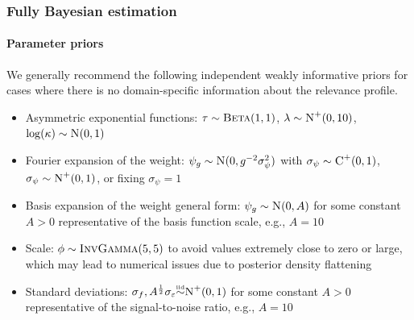 \documentclass{snedecorbeamer}
\begin{document}
\begin{frame}%
  \label{frm:bayesian-priors}
  \frametitle{Fully Bayesian estimation}
  \framesubtitle{Parameter priors}

  We generally recommend the following independent weakly informative priors for
  cases where there is no domain-specific information about the relevance profile.
  \begin{itemize}
  \item Asymmetric exponential functions:
    $\tau \sim \textsc{Beta}(1, 1)$,
    $\lambda \sim \textsc{N}^{+}(0, 10)$,
    $\log(\kappa) \sim \textsc{N}(0, 1)$
  \item Fourier expansion of the weight:
    $\psi_g\sim\textsc{N}(0, g^{-2}\sigma^2_\psi)$ with
    $\sigma_\psi\sim\textsc{C}^+(0, 1)$, $\sigma_\psi\sim\textsc{N}^+(0, 1)$,
    or fixing $\sigma_\psi = 1$
  \item Basis expansion of the weight general form:
    $\psi_g \sim \textsc{N}(0, A)$ for some constant
    $A>0$ representative of the basis function scale, e.g., $A = 10$
  \item Scale: $\phi \sim \textsc{InvGamma}(5, 5)$ to avoid
    values extremely close to zero or large, which may lead to numerical issues
    due to posterior density flattening
  \item Standard deviations: $\sigma_f, A^{\frac{1}{2}}\sigma_{\varepsilon}
    \smash{\overset{\text{\tiny iid}}{\sim}} \textsc{N}^{+}(0, 1)$ for some constant $A>0$
    representative of the signal-to-noise ratio, e.g., $A = 10$
  \end{itemize}
\end{frame}
\end{document}
